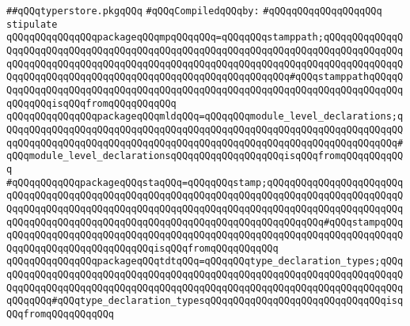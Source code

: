 \label{src/lib/compiler/front/typer-stuff/modules/typerstore.pkg}
\verb|##qQQqtyperstore.pkgqQQq|\newline
\newline
\verb|#qQQqCompiledqQQqby:|\newline
\verb|#qQQqqQQqqQQqqQQqqQQq|\newline
\newline
\newline
\newline
\verb|stipulate|\newline
\verb|qQQqqQQqqQQqqQQqpackageqQQqmpqQQqqQQq=qQQqqQQqstamppath;qQQqqQQqqQQqqQQqqQQqqQQqqQQqqQQqqQQqqQQqqQQqqQQqqQQqqQQqqQQqqQQqqQQqqQQqqQQqqQQqqQQqqQQqqQQqqQQqqQQqqQQqqQQqqQQqqQQqqQQqqQQqqQQqqQQqqQQqqQQqqQQqqQQqqQQqqQQqqQQqqQQqqQQqqQQqqQQqqQQqqQQqqQQqqQQqqQQqqQQqqQQq#qQQqstamppathqQQqqQQqqQQqqQQqqQQqqQQqqQQqqQQqqQQqqQQqqQQqqQQqqQQqqQQqqQQqqQQqqQQqqQQqqQQqqQQqqQQqisqQQqfromqQQqqQQqqQQq|\newline
\verb|qQQqqQQqqQQqqQQqpackageqQQqmldqQQq=qQQqqQQqmodule_level_declarations;qQQqqQQqqQQqqQQqqQQqqQQqqQQqqQQqqQQqqQQqqQQqqQQqqQQqqQQqqQQqqQQqqQQqqQQqqQQqqQQqqQQqqQQqqQQqqQQqqQQqqQQqqQQqqQQqqQQqqQQqqQQqqQQqqQQqqQQqqQQq#qQQqmodule_level_declarationsqQQqqQQqqQQqqQQqqQQqisqQQqfromqQQqqQQqqQQq|\newline
\verb|#qQQqqQQqqQQqpackageqQQqstaqQQq=qQQqqQQqstamp;qQQqqQQqqQQqqQQqqQQqqQQqqQQqqQQqqQQqqQQqqQQqqQQqqQQqqQQqqQQqqQQqqQQqqQQqqQQqqQQqqQQqqQQqqQQqqQQqqQQqqQQqqQQqqQQqqQQqqQQqqQQqqQQqqQQqqQQqqQQqqQQqqQQqqQQqqQQqqQQqqQQqqQQqqQQqqQQqqQQqqQQqqQQqqQQqqQQqqQQqqQQqqQQqqQQqqQQqqQQq#qQQqstampqQQqqQQqqQQqqQQqqQQqqQQqqQQqqQQqqQQqqQQqqQQqqQQqqQQqqQQqqQQqqQQqqQQqqQQqqQQqqQQqqQQqqQQqqQQqqQQqqQQqisqQQqfromqQQqqQQqqQQq|\newline
\verb|qQQqqQQqqQQqqQQqpackageqQQqtdtqQQq=qQQqqQQqtype_declaration_types;qQQqqQQqqQQqqQQqqQQqqQQqqQQqqQQqqQQqqQQqqQQqqQQqqQQqqQQqqQQqqQQqqQQqqQQqqQQqqQQqqQQqqQQqqQQqqQQqqQQqqQQqqQQqqQQqqQQqqQQqqQQqqQQqqQQqqQQqqQQqqQQqqQQqqQQq#qQQqtype_declaration_typesqQQqqQQqqQQqqQQqqQQqqQQqqQQqqQQqisqQQqfromqQQqqQQqqQQq|\newline
